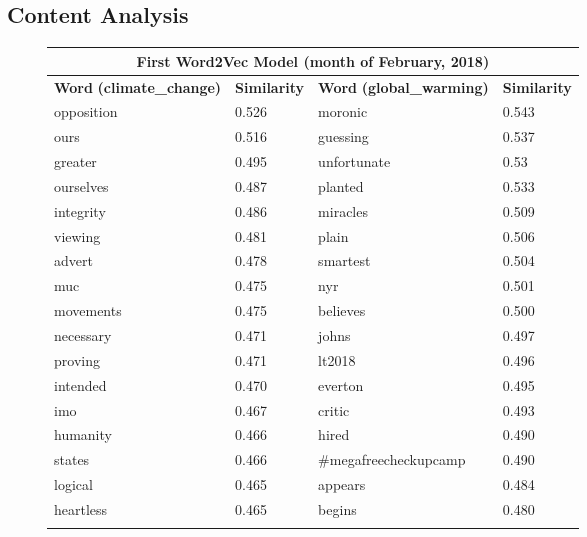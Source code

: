 \documentclass{paper}
\begin{document}
\subsection{Content Analysis}
\begin{table}[ht]
    \centering
    \begin{subfigure}{0.49\textwidth}
        \centering
        \begin{tabularx}{\textwidth}{@{}XXXX@{}}\toprule
            \multicolumn{4}{c}{\textbf{First Word2Vec Model (month of February, 2018)}}\\\midrule
            \textbf{Word} \newline \textbf{\footnotesize{(climate\_change)}}  & \textbf{Similarity} & \textbf{Word} \newline\textbf{\footnotesize{(global\_warming)}}  & \textbf{Similarity} \\\midrule
            opposition & 0.526 & moronic & 0.543\\\hdashline
            ours & 0.516 & guessing & 0.537\\\hdashline
            greater & 0.495 & unfortunate & 0.53\\\hdashline4
            ourselves & 0.487 & planted & 0.533\\\hdashline
            integrity & 0.486 & miracles & 0.509\\\hdashline
            viewing & 0.481 & plain & 0.506\\\hdashline
            advert & 0.478 & smartest & 0.504\\\hdashline
            muc & 0.475 & nyr & 0.501\\\hdashline
            movements & 0.475 & believes & 0.500\\\hdashline
            necessary & 0.471 & johns & 0.497\\\hdashline
            proving & 0.471 & lt2018 & 0.496\\\hdashline
            intended & 0.470 & everton & 0.495\\\hdashline
            imo & 0.467 & critic & 0.493\\\hdashline
            humanity & 0.466 & hired & 0.490\\\hdashline
            states & 0.466 & \#megafree\newline checkupcamp & 0.490 \\\hdashline
            logical & 0.465 & appears & 0.484\\\hdashline
            heartless & 0.465 & begins & 0.480\\\hdashline

\end{tabularx}
\end{subfigure}
\end{table}
\end{document}
